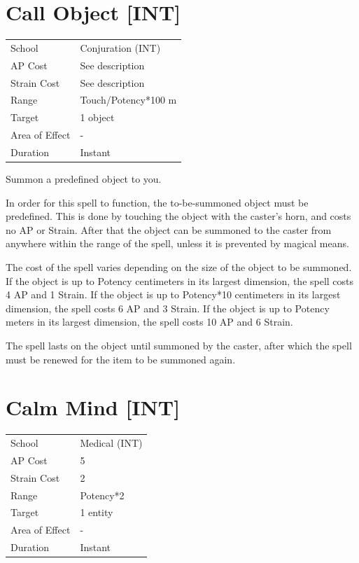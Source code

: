 \documentclass[11pt,a4paper,twocolumn]{book}
\begin{document}
\section*{Call Object [INT]}
{
	\begin{tabu} to 75mm{| X[l,4] | X[l,7] |}
		\hline
		School 			& Conjuration (INT) 	\\
        AP Cost	      	& See description 		\\
        Strain Cost     & See description 		\\
        Range     		& Touch/Potency*100 m 	\\
        Target      	& 1 object 				\\
        Area of Effect  & -	 					\\
        Duration     	& Instant 				\\ \hline
	\end{tabu}
		
}

\medskip

Summon a predefined object to you.

In order for this spell to function, the to-be-summoned object must be predefined. This is done by touching the object with the caster's horn, and costs no AP or Strain. After that the object can be summoned to the caster from anywhere within the range of the spell, unless it is prevented by magical means.

The cost of the spell varies depending on the size of the object to be summoned. If the object is up to Potency centimeters in its largest dimension, the spell costs 4 AP and 1 Strain. If the object is up to Potency*10 centimeters in its largest dimension, the spell costs 6 AP and 3 Strain. If the object is up to Potency meters in its largest dimension, the spell costs 10 AP and 6 Strain.

The spell lasts on the object until summoned by the caster, after which the spell must be renewed for the item to be summoned again.

\vfill


\section*{Calm Mind [INT]}
{
	\begin{tabu} to 75mm{| X[l,4] | X[l,7] |}
		\hline
		School 			& Medical (INT) 		\\
        AP Cost	      	& 5 					\\
        Strain Cost     & 2 					\\
        Range     		& Potency*2 			\\
        Target      	& 1 entity 				\\
        Area of Effect  & - 	 				\\
        Duration     	& Instant				\\ \hline
	\end{tabu}
		
}
\end{document}
